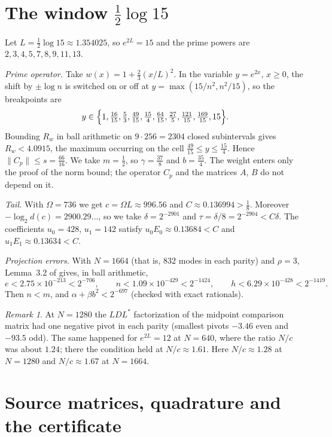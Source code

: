 \documentclass[11pt]{amsart}
\theoremstyle{remark}
\newtheorem{remark}[proposition]{Remark}
\numberwithin{equation}{section}
\begin{document}
\section{The window \texorpdfstring{$\frac12\log15$}{(1/2) log 15}}\label{sec:mu15}
Let $L=\frac12\log15\approx1.354025$, so $e^{2L}=15$ and the prime powers are $2,3,4,5,7,8,9,11,13$.

\emph{Prime operator.} Take $w(x)=1+\frac23(x/L)^2$. In the variable $y=e^{2x}$, $x\ge0$, the shift by $\pm\log n$ is switched on or off at $y=\max(15/n^2,n^2/15)$, so the breakpoints are
\[
y\in\Bigl\{1,\tfrac{16}{15},\tfrac53,\tfrac{49}{15},\tfrac{15}4,\tfrac{64}{15},\tfrac{27}5,\tfrac{121}{15},\tfrac{169}{15},15\Bigr\}.
\]
Bounding $R_w$ in ball arithmetic on $9\cdot256=2304$ closed subintervals gives $R_w<4.0915$, the maximum occurring on the cell $\frac{49}{15}\le y\le\frac{15}4$. Hence $\|C_p\|\le s=\frac{66}{16}$. We take $m=\frac12$, so $\gamma=\frac{37}8$ and $b=\frac{35}4$. The weight enters only the proof of the norm bound; the operator $C_p$ and the matrices $A$, $B$ do not depend on it.

\emph{Tail.} With $\Omega=736$ we get $c=\Omega L\approx996.56$ and $C\approx0.136994>\frac18$. Moreover $-\log_2d(c)=2900.29\ldots$, so we take $\delta=2^{-2901}$ and $\tau=\delta/8=2^{-2904}<C\delta$. The coefficients $u_0=428$, $u_1=142$ satisfy $u_0E_0\approx0.13684<C$ and $u_1E_1\approx0.13634<C$.

\emph{Projection errors.} With $N=1664$ (that is, $832$ modes in each parity) and $\rho=3$, Lemma~3.2 of \cite{MoriVII} gives, in ball arithmetic,
\[
e<2.75\times10^{-213}<2^{-706},\qquad n<1.09\times10^{-429}<2^{-1424},\qquad h<6.29\times10^{-428}<2^{-1419} .
\]
Then $n<m$, and $\alpha+\beta b^2<2^{-697}$ (checked with exact rationals).

\begin{remark}\label{rem:N1280}
At $N=1280$ the $LDL^*$ factorization of the midpoint comparison matrix had one negative pivot in each parity (smallest pivots $-3.46$ even and $-93.5$ odd). The same happened for $e^{2L}=12$ at $N=640$, where the ratio $N/c$ was about $1.24$; there the condition held at $N/c\approx1.61$. Here $N/c\approx1.28$ at $N=1280$ and $N/c\approx1.67$ at $N=1664$.
\end{remark}

\section{Source matrices, quadrature and the certificate}\label{sec:certificate}
\end{document}

